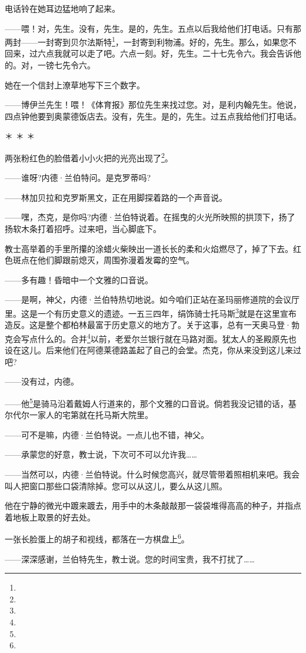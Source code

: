 \par 电话铃在她耳边猛地响了起来。
\par ——喂！对，先生。没有，先生。是的，先生。五点以后我给他们打电话。只有那两封——一封寄到贝尔法斯特\footnote{}，一封寄到利物浦。好的，先生。那么，如果您不回来，过六点我就可以走了吧。六点一刻。好，先生。二十七先令六。我会告诉他的。对，一镑七先令六。
\par 她在一个信封上潦草地写下三个数字。
\par ——博伊兰先生！喂！《体育报》那位先生来找过您。对，是利内翰先生。他说，四点钟他要到奥蒙德饭店去。没有，先生。是的，先生。过五点我给他们打电话。
\par ＊ ＊ ＊
\par 两张粉红色的脸借着小小火把的光亮出现了\footnote{}。
\par ——谁呀?内德·兰伯特问。是克罗蒂吗?
\par ——林加贝拉和克罗斯黑文，正在用脚探着路的一个声音说。
\par ——嘿，杰克，是你吗?内德·兰伯特说着。在摇曳的火光所映照的拱顶下，扬了扬软木条打着招呼。过来吧，当心脚底下。
\par 教士高举着的手里所攥的涂蜡火柴映出一道长长的柔和火焰燃尽了，掉了下去。红色斑点在他们脚跟前熄灭，周围弥漫着发霉的空气。
\par ——多有趣！昏暗中一个文雅的口音说。
\par ——是啊，神父，内德·兰伯特热切地说。如今咱们正站在圣玛丽修道院的会议厅里。这是一个有历史意义的遗迹。一五三四年，绢饰骑士托马斯\footnote{}就是在这里宣布造反。这是整个都柏林最富于历史意义的地方了。关于这事，总有一天奥马登·勃克会写点什么的。合并\footnote{}以前，老爱尔兰银行就在马路对面。犹太人的圣殿原先也设在这儿。后来他们在阿德莱德路盖起了自己的会堂。杰克，你从来没到这儿来过吧?
\par ——没有过，内德。
\par ——他\footnote{}是骑马沿着戴姆人行道来的，那个文雅的口音说。倘若我没记错的话，基尔代尔一家人的宅第就在托马斯大院里。
\par ——可不是嘛，内德·兰伯特说。一点儿也不错，神父。
\par ——承蒙您的好意，教士说，下次可不可以允许我……
\par ——当然可以，内德·兰伯特说。什么时候您高兴，就尽管带着照相机来吧。我会叫人把窗口那些口袋清除掉。您可以从这儿，要么从这儿照。
\par 他在宁静的微光中踱来踱去，用手中的木条敲敲那一袋袋堆得高高的种子，并指点着地板上取景的好去处。
\par 一张长脸蛋上的胡子和视线，都落在一方棋盘上\footnote{}。
\par ——深深感谢，兰伯特先生，教士说。您的时间宝贵，我不打扰了……
